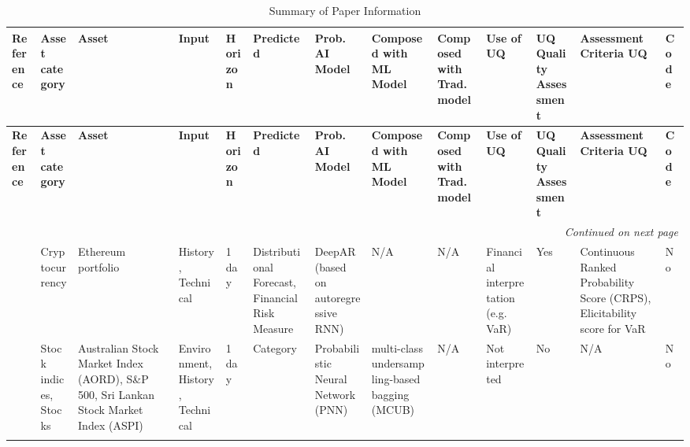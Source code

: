\begin{landscape}
\begin{longtable}{p{0.07\textheight} p{0.07\textheight} p{0.16\textheight} p{0.07\textheight} p{0.07\textheight} p{0.07\textheight} p{0.14\textheight} p{0.07\textheight} p{0.07\textheight} p{0.07\textheight} p{0.07\textheight} p{0.1\textheight} p{0.04\textheight}}
        \caption[Descriptive table of all papers in sample]{Summary of Paper Information}
        \label{table:paper_info_summary} \\
        \toprule
        \textbf{Reference} & \textbf{Asset category} & \textbf{Asset} & \textbf{Input} & \textbf{Horizon} & \textbf{Predicted} & \textbf{Prob. AI Model} & \textbf{Composed with ML Model} & \textbf{Composed with Trad. model} & \textbf{Use of UQ} & \textbf{UQ Quality Assessment} & \textbf{Assessment Criteria UQ} & \textbf{Code} \\
        \midrule
        \endfirsthead

        \toprule
        \textbf{Reference} & \textbf{Asset category} & \textbf{Asset} & \textbf{Input} & \textbf{Horizon} & \textbf{Predicted} & \textbf{Prob. AI Model} & \textbf{Composed with ML Model} & \textbf{Composed with Trad. model} & \textbf{Use of UQ} & \textbf{UQ Quality Assessment} & \textbf{Assessment Criteria UQ} & \textbf{Code} \\
        \midrule
        \endhead

        \midrule
        \multicolumn{13}{r}{\textit{Continued on next page}} \\
        \midrule
        \endfoot

        \bottomrule
        \endlastfoot

         \textcite{Almeida2024RiskForecasting} & Cryptocurrency & Ethereum portfolio & History, Technical & 1 day & Distributional Forecast, Financial Risk Measure & DeepAR (based on autoregressive RNN) & N/A & N/A & Financial interpretation (e.g. VaR) & Yes & Continuous Ranked Probability Score (CRPS), Elicitability score for VaR & No \\
        \addlinespace
        \hdashline[0.2pt/3pt]
        \addlinespace
        
        \textcite{Chandrasekara2019pnn} & Stock indices, Stocks & Australian Stock Market Index (AORD), S\&P 500, Sri Lankan Stock Market Index (ASPI) & Environment, History, Technical & 1 day & Category & Probabilistic Neural Network (PNN) & multi-class undersampling-based bagging (MCUB) & N/A & Not interpreted & No & N/A & No \\
        \addlinespace
        \hdashline[0.2pt/3pt]
        \addlinespace
        

\end{longtable}
\end{landscape}
